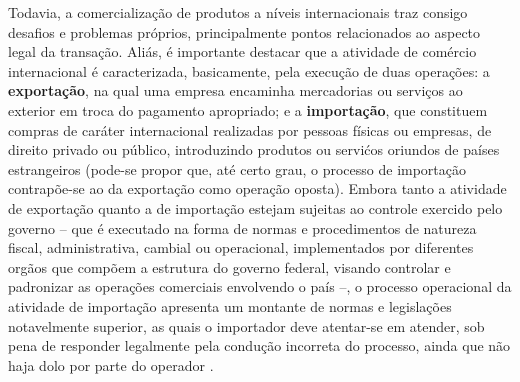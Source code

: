 Todavia, a comercialização de produtos a níveis internacionais traz consigo desafios e problemas próprios, principalmente pontos relacionados ao aspecto legal da transação. Aliás, é importante destacar que a atividade de comércio internacional é caracterizada, basicamente, pela execução de duas operações: a \textbf{exportação}, na qual uma empresa encaminha mercadorias ou serviços ao exterior em troca do pagamento apropriado; e a \textbf{importação}, que constituem compras de caráter internacional realizadas por pessoas físicas ou empresas, de direito privado ou público, introduzindo produtos ou servićos oriundos de países estrangeiros (pode-se propor que, até certo grau, o processo de importação contrapõe-se ao da exportação como operação oposta). Embora tanto a atividade de exportação quanto a de importação estejam sujeitas ao controle exercido pelo governo -- que é executado na forma de normas e procedimentos de natureza fiscal, administrativa, cambial ou operacional, implementados por diferentes orgãos que compõem a estrutura do governo federal, visando controlar e padronizar as operações comerciais envolvendo o país --, o processo operacional da atividade de importação apresenta um montante de normas e legislações notavelmente superior, as quais o importador deve atentar-se em atender, sob pena de responder legalmente pela condução incorreta do processo, ainda que não haja dolo por parte do operador \cite{segalis2015fundamentos}. 


